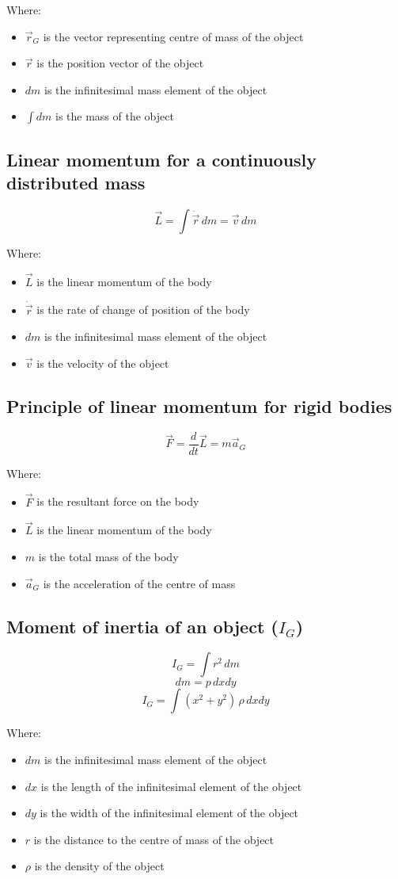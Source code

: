 \documentclass[11pt]{article}
\begin{document}
Where:
\begin{itemize}
\item \(\vec{r}_G\) is the vector representing centre of mass of the object
\item \(\vec{r}\) is the position vector of the object
\item \(dm\) is the infinitesimal mass element of the object
\item \(\int dm\) is the mass of the object
\end{itemize}
\subsection{Linear momentum for a continuously distributed mass}
\label{sec:org7b22286}
\[\vec{L} = \int \dot{\vec{r}} \, dm = \vec{v} \, dm\]

Where:
\begin{itemize}
\item \(\vec{L}\) is the linear momentum of the body
\item \(\dot{\vec{r}}\) is the rate of change of position of the body
\item \(dm\) is the infinitesimal mass element of the object
\item \(\vec{v}\) is the velocity of the object
\end{itemize}
\subsection{Principle of linear momentum for rigid bodies}
\label{sec:org2701236}
\[\vec{F} = \frac{d}{dt} \vec{L} = m \vec{a}_G\]

Where:
\begin{itemize}
\item \(\vec{F}\) is the resultant force on the body
\item \(\vec{L}\) is the linear momentum of the body
\item \(m\) is the total mass of the body
\item \(\vec{a}_G\) is the acceleration of the centre of mass
\end{itemize}
\subsection{Moment of inertia of an object (\(I_G\))}
\label{sec:org9ae9701}
\[I_G = \int r^2 \, dm\]
\[dm = p \, dx dy\]
\[I_G = \int (x^2 + y^2) \, \rho \, dx dy\]

Where:
\begin{itemize}
\item \(dm\) is the infinitesimal mass element of the object
\item \(dx\) is the length of the infinitesimal element of the object
\item \(dy\) is the width of the infinitesimal element of the object
\item \(r\) is the distance to the centre of mass of the object
\item \(\rho\) is the density of the object
\end{itemize}
\end{document}
